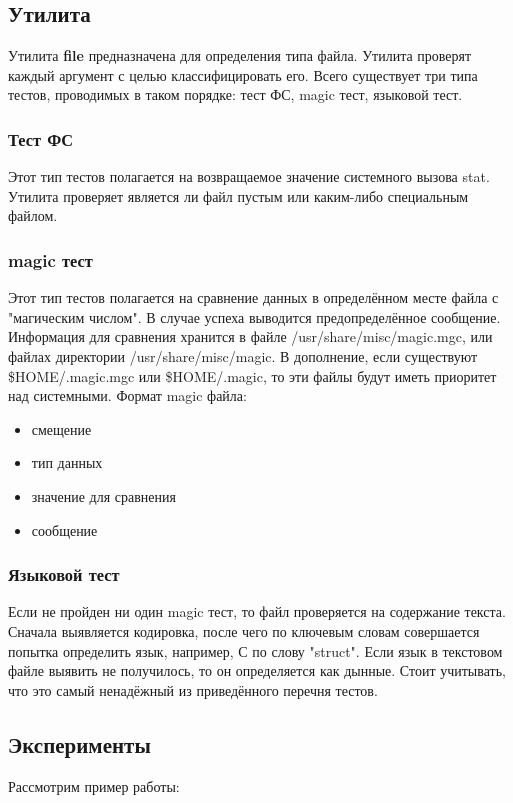 \documentclass[a4paper]{article}
\begin{document}
\subsection{ Утилита} Утилита \textbf{file} предназначена для определения типа файла. Утилита проверят каждый аргумент с целью классифицировать его. Всего существует три типа тестов, проводимых в таком порядке: тест ФС, magic тест, языковой тест.

\subsubsection{ Тест ФС}
Этот тип тестов полагается на возвращаемое значение системного вызова stat. Утилита проверяет является ли файл пустым или каким-либо специальным файлом.
\subsubsection{ magic тест}
Этот тип тестов полагается на сравнение данных в определённом месте файла с "магическим числом". В случае успеха выводится предопределённое сообщение. Информация для сравнения хранится в файле /usr/share/misc/magic.mgc, или файлах директории /usr/share/misc/magic.  В дополнение, если существуют \$HOME/.magic.mgc или \$HOME/.magic, то эти файлы будут иметь приоритет над системными. Формат magic файла:
\begin{itemize}
\item смещение
\item тип данных
\item значение для сравнения
\item сообщение
\end{itemize}

\subsubsection{ Языковой тест}
Если не пройден ни один magic тест, то файл проверяется на содержание текста. Сначала выявляется кодировка, после чего по ключевым словам совершается попытка определить язык, например, С по слову "struct". Если язык в текстовом файле выявить не получилось, то он определяется как дынные. Стоит учитывать, что это самый ненадёжный из приведённого перечня тестов. 

\subsection{ Эксперименты}
Рассмотрим пример работы:

\end{document}
